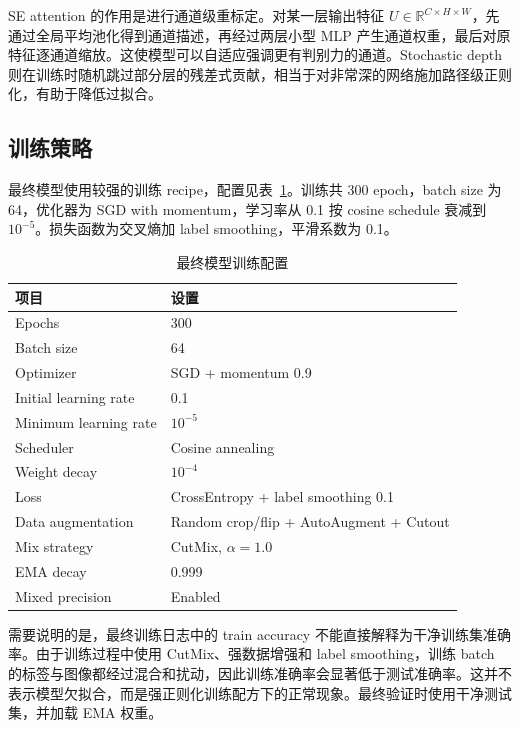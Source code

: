 \documentclass[UTF8,a4paper,11pt]{ctexart}
\begin{document}
SE attention 的作用是进行通道级重标定。对某一层输出特征 $U\in\mathbb{R}^{C\times H\times W}$，先通过全局平均池化得到通道描述，再经过两层小型 MLP 产生通道权重，最后对原特征逐通道缩放。这使模型可以自适应强调更有判别力的通道。Stochastic depth 则在训练时随机跳过部分层的残差式贡献，相当于对非常深的网络施加路径级正则化，有助于降低过拟合。

\subsection{训练策略}

最终模型使用较强的训练 recipe，配置见表~\ref{tab:final_training_recipe}。训练共 300 epoch，batch size 为 64，优化器为 SGD with momentum，学习率从 0.1 按 cosine schedule 衰减到 $10^{-5}$。损失函数为交叉熵加 label smoothing，平滑系数为 0.1。

\begin{table}[H]
  \centering
  \caption{最终模型训练配置}
  \label{tab:final_training_recipe}
  \begin{tabular}{ll}
    \toprule
    项目 & 设置 \\
    \midrule
    Epochs & 300 \\
    Batch size & 64 \\
    Optimizer & SGD + momentum 0.9 \\
    Initial learning rate & 0.1 \\
    Minimum learning rate & $10^{-5}$ \\
    Scheduler & Cosine annealing \\
    Weight decay & $10^{-4}$ \\
    Loss & CrossEntropy + label smoothing 0.1 \\
    Data augmentation & Random crop/flip + AutoAugment + Cutout \\
    Mix strategy & CutMix, $\alpha=1.0$ \\
    EMA decay & 0.999 \\
    Mixed precision & Enabled \\
    \bottomrule
  \end{tabular}
\end{table}

需要说明的是，最终训练日志中的 train accuracy 不能直接解释为干净训练集准确率。由于训练过程中使用 CutMix、强数据增强和 label smoothing，训练 batch 的标签与图像都经过混合和扰动，因此训练准确率会显著低于测试准确率。这并不表示模型欠拟合，而是强正则化训练配方下的正常现象。最终验证时使用干净测试集，并加载 EMA 权重。
\end{document}
